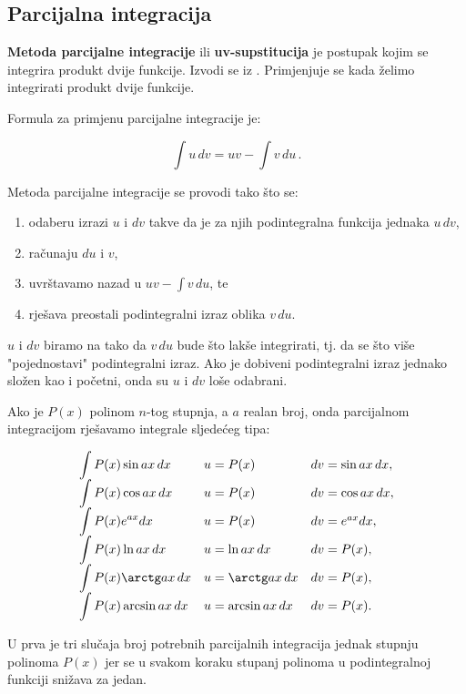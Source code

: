 \subsection{Parcijalna integracija}

\textbf{Metoda parcijalne integracije} ili \textbf{uv-supstitucija} je postupak
kojim se integrira produkt dvije funkcije. Izvodi se iz . Primjenjuje se kada želimo
integrirati produkt dvije funkcije.


Formula za primjenu parcijalne integracije je:

$$
\int u\,dv = uv - \int v\,du\,.
$$

Metoda parcijalne integracije se provodi tako što se:
\begin{enumerate}
    \item odaberu izrazi $u$ i $dv$ takve da je za njih podintegralna funkcija
    jednaka $u\,dv$,
    \item računaju $du$ i $v$,
    \item uvrštavamo nazad u $\displaystyle uv - \int v\,du$, te
    \item rješava preostali podintegralni izraz oblika $v\,du$.
\end{enumerate}

$u$ i $dv$ biramo na tako da $v\,du$ bude što lakše integrirati, tj. da se što
više "pojednostavi" podintegralni izraz. Ako je dobiveni podintegralni izraz
jednako složen kao i početni, onda su $u$ i $dv$ loše odabrani.

Ako je $P(x)$ polinom $n$-tog stupnja, a $a$ realan broj, onda parcijalnom
integracijom rješavamo integrale sljedećeg tipa:

$$
\begin{array}{lll}
    \displaystyle \int P(x)\sin ax\,dx & u=P(x) & dv=\sin ax\,dx,\\
    \displaystyle \int P(x)\cos ax\,dx & u=P(x) & dv=\cos ax\,dx,\\
    \displaystyle \int P(x)e^{ax}dx & u=P(x) & dv=e^{ax}dx,\\
    \displaystyle \int P(x)\ln ax\,dx & u=\ln ax\,dx & dv=P(x),\\
    \displaystyle \int P(x)\arctg ax\,dx & u=\arctg ax\,dx & dv=P(x),\\
    \displaystyle \int P(x)\arcsin ax\,dx & u=\arcsin ax\,dx & dv=P(x).
\end{array}
$$

U prva je tri slučaja broj potrebnih parcijalnih integracija jednak stupnju
polinoma $P(x)$ jer se u svakom koraku stupanj polinoma u podintegralnoj
funkciji snižava za jedan.

